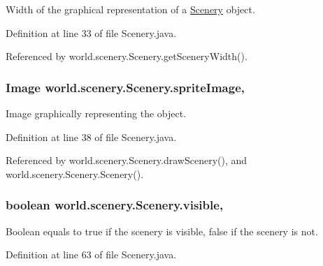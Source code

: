 Width of the graphical representation of a \hyperlink{classworld_1_1scenery_1_1_scenery}{Scenery} object. 



Definition at line 33 of file Scenery.\-java.



Referenced by world.\-scenery.\-Scenery.\-get\-Scenery\-Width().

\hypertarget{classworld_1_1scenery_1_1_scenery_a512d9c0a154e6843389e343d80843326}{
\subsubsection[{sprite\-Image}]{\setlength{\rightskip}{0pt plus 5cm}Image world.\-scenery.\-Scenery.\-sprite\-Image\hspace{0.3cm}{\ttfamily [protected]}, {\ttfamily [inherited]}}}\label{classworld_1_1scenery_1_1_scenery_a512d9c0a154e6843389e343d80843326}


Image graphically representing the object. 



Definition at line 38 of file Scenery.\-java.



Referenced by world.\-scenery.\-Scenery.\-draw\-Scenery(), and world.\-scenery.\-Scenery.\-Scenery().

\hypertarget{classworld_1_1scenery_1_1_scenery_a7b22a78d3126c947b7010fdbbea02218}{
\subsubsection[{visible}]{\setlength{\rightskip}{0pt plus 5cm}boolean world.\-scenery.\-Scenery.\-visible\hspace{0.3cm}{\ttfamily [protected]}, {\ttfamily [inherited]}}}\label{classworld_1_1scenery_1_1_scenery_a7b22a78d3126c947b7010fdbbea02218}


Boolean equals to true if the scenery is visible, false if the scenery is not. 



Definition at line 63 of file Scenery.\-java.



